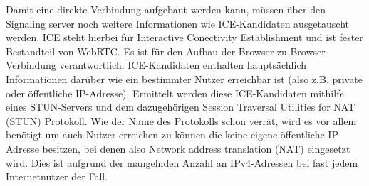 Damit eine direkte Verbindung aufgebaut werden kann, müssen über den Signaling server noch weitere Informationen wie ICE-Kandidaten ausgetauscht werden. ICE steht hierbei für Interactive Conectivity Establishment und ist fester Bestandteil von WebRTC. Es ist für den Aufbau der Browser-zu-Browser-Verbindung verantwortlich. ICE-Kandidaten enthalten hauptsächlich Informationen darüber wie ein bestimmter Nutzer erreichbar ist (also z.B. private oder öffentliche IP-Adresse). Ermittelt werden diese ICE-Kandidaten mithilfe eines STUN-Servers und dem dazugehörigen Session Traversal Utilities for NAT (STUN) Protokoll. Wie der Name des Protokolls schon verrät, wird es vor allem benötigt um auch Nutzer erreichen zu können die keine eigene öffentliche IP-Adresse besitzen, bei denen also Network address translation (NAT) eingesetzt wird. Dies ist aufgrund der mangelnden Anzahl an IPv4-Adressen bei fast jedem Internetnutzer der Fall.


